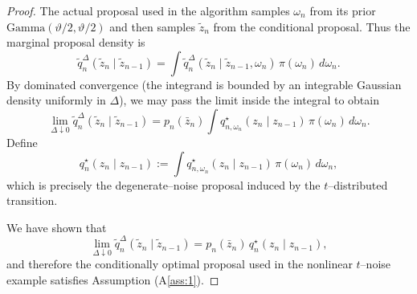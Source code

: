 \documentclass[english,13pt]{article}
\numberwithin{equation}{section}
\begin{document}
\begin{proof}
The actual proposal used in the algorithm samples $\omega_n$ from its prior
$\mathrm{Gamma}(\vartheta/2,\vartheta/2)$ and then samples
$\tilde z_n$ from the conditional proposal. Thus the marginal proposal density is
\[
\tilde q_n^\Delta(\tilde z_n \mid \tilde z_{n-1})
=
\int
\tilde q_n^\Delta(\tilde z_n \mid \tilde z_{n-1},\omega_n)\,
\pi(\omega_n)\, d\omega_n.
\]
By dominated convergence (the integrand is bounded by an integrable Gaussian
density uniformly in $\Delta$), we may pass the limit inside the integral to obtain
\[
\lim_{\Delta\downarrow 0}
\tilde q_n^\Delta(\tilde z_n \mid \tilde z_{n-1})
=
p_n(\bar z_n)
\int q_{n,\omega_n}^\star(z_n\mid z_{n-1})\,\pi(\omega_n)\,d\omega_n.
\]
Define
\[
q_n^\star(z_n\mid z_{n-1})
:=
\int q_{n,\omega_n}^\star(z_n\mid z_{n-1})\,\pi(\omega_n)\,d\omega_n,
\]
which is precisely the degenerate--noise proposal induced by the $t$--distributed
transition.

We have shown that
\[
\lim_{\Delta\downarrow 0}
\tilde q_n^\Delta(\tilde z_n \mid \tilde z_{n-1})
=
p_n(\bar z_n)\, q_n^\star(z_n\mid z_{n-1}),
\]
and therefore the conditionally optimal proposal used in the nonlinear
$t$--noise example satisfies Assumption (A\ref{ass:1}).
\end{proof}
\end{document}
